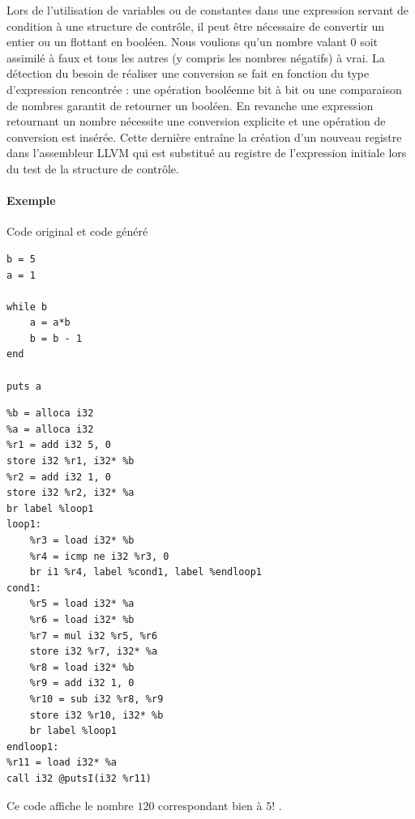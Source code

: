 \documentclass[12pt]{article}
\begin{document}
Lors de l'utilisation de variables ou de constantes dans une expression servant de condition à une structure de contrôle, il peut être nécessaire de convertir un entier ou un flottant en booléen. Nous voulions qu'un nombre valant 0 soit assimilé à faux et tous les autres (y compris les nombres négatifs) à vrai. La détection du besoin de réaliser une conversion se fait en fonction du type d'expression rencontrée : une opération booléenne bit à bit ou une comparaison de nombres garantit de retourner un booléen. En revanche une expression retournant un nombre nécessite une conversion explicite et une opération de conversion est insérée. Cette dernière entraîne la création d'un nouveau registre dans l'assembleur LLVM qui est substitué au registre de l'expression initiale lors du test de la structure de contrôle.

\paragraph{Exemple} Code original et code généré

\vspace{0.5cm}

\begin{minipage}{0.48\textwidth}
\begin{verbatim}
b = 5
a = 1

while b
    a = a*b
    b = b - 1
end

puts a
\end{verbatim}
\end{minipage}
\begin{minipage}{0.48\textwidth}
\begin{verbatim}
%b = alloca i32
%a = alloca i32
%r1 = add i32 5, 0
store i32 %r1, i32* %b
%r2 = add i32 1, 0
store i32 %r2, i32* %a
br label %loop1
loop1:
    %r3 = load i32* %b
    %r4 = icmp ne i32 %r3, 0
    br i1 %r4, label %cond1, label %endloop1
cond1:
    %r5 = load i32* %a
    %r6 = load i32* %b
    %r7 = mul i32 %r5, %r6
    store i32 %r7, i32* %a
    %r8 = load i32* %b
    %r9 = add i32 1, 0
    %r10 = sub i32 %r8, %r9
    store i32 %r10, i32* %b
    br label %loop1
endloop1:
%r11 = load i32* %a
call i32 @putsI(i32 %r11)

\end{verbatim}
\end{minipage}

\vspace{0.5cm}

Ce code affiche le nombre $120$ correspondant bien à $5!$ .
\end{document}
